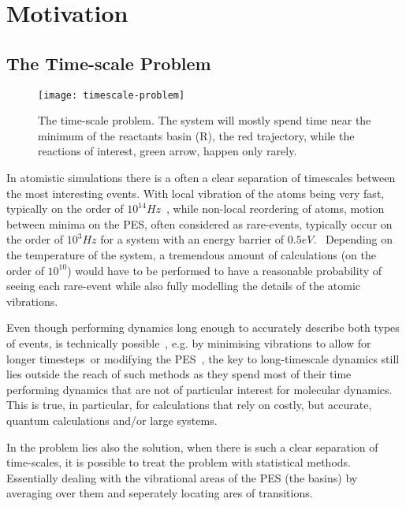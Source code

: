 \section{Motivation}

\subsection{The Time-scale Problem}
\label{sec:tst-timescale-problem}

\begin{figure}[h]
\begin{center}
\texttt{[image: timescale-problem]}
    \parbox{0.85\linewidth}{
\caption{The time-scale problem.
The system will mostly spend time near the minimum of the reactants basin (R), the red trajectory, while the reactions of interest, green arrow, happen only rarely.}
\label{fig:timescale-problem}
    }
\end{center}
\end{figure}

In atomistic simulations there is a often a clear separation of timescales between the most interesting events.
With local vibration of the atoms being very fast, typically on the order of $10^{14} \unit{Hz}$~\citemiss,
while non-local reordering of atoms, motion between minima on the PES, often considered as rare-events, typically occur on the order of $10^3 \unit{Hz}$ for a system with an energy barrier of $0.5 \unit{eV}$.~\citemiss
Depending on the temperature of the system, a tremendous amount of calculations (on the order of $10^{10}$) would have to be performed to have a reasonable probability of seeing each rare-event while also fully modelling the details of the atomic vibrations.

Even though performing dynamics long enough to accurately describe both types of events, is technically possible~\citemiss, e.g. by minimising vibrations to allow for longer timesteps~\citemiss or modifying the PES~\cite{hyperdynamics-voter-1997}, the key to long-timescale dynamics still lies outside the reach of such methods as they spend most of their time performing dynamics that are not of particular interest for molecular dynamics.
This is true, in particular, for calculations that rely on costly, but accurate, quantum calculations and/or large systems.

In the problem lies also the solution, when there is such a clear separation of time-scales, it is possible to treat the problem with statistical methods.
Essentially dealing with the vibrational areas of the PES (the basins) by averaging over them and seperately locating ares of transitions.

